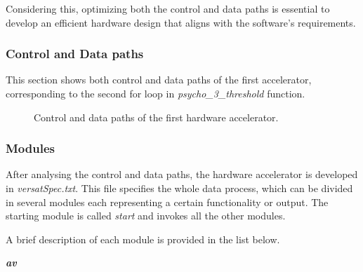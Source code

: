 Considering this, optimizing both the control and data paths is essential to develop an efficient hardware design that aligns with the software's requirements.

\subsubsection{Control and Data paths}
This section shows both control and data paths of the first accelerator, corresponding to the second for loop in \textit{psycho\_3\_threshold} function.

\begin{figure}[H]
\centerline{}
\caption{Control and data paths of the first hardware accelerator.}
\label{data1}
\end{figure}

\subsubsection{Modules}
After analysing the control and data paths, the hardware accelerator is developed in \textit{versatSpec.txt}. This file specifies the whole data process, which can be divided in several modules each representing a certain functionality or output. The starting module is called \textit{start} and invokes all the other modules.

A brief description of each module is provided in the list below.

\vspace{0.5cm}

\textit{\textbf{av}}

